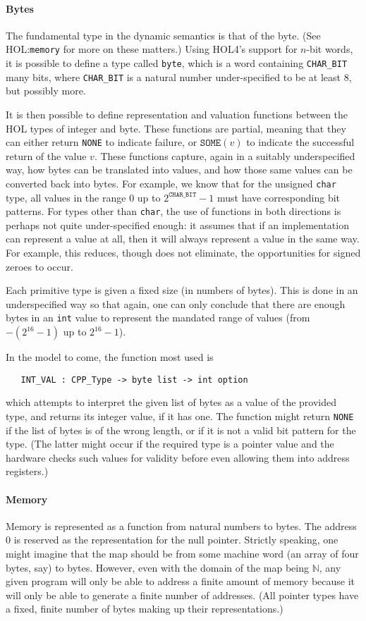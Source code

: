 \documentclass[11pt]{article}
\newcommand{\HOLfile}[1]{HOL:\texttt{#1}}
\begin{document}
\paragraph{Bytes} The fundamental type in the dynamic semantics is
that of the byte.  (See \HOLfile{memory} for more on these matters.)
Using HOL4's support for $n$-bit words, it is possible to define a
type called \texttt{byte}, which is a word containing
\texttt{CHAR_BIT} many bits, where \texttt{CHAR_BIT} is a natural
number under-specified to be at least 8, but possibly more.

It is then possible to define representation and valuation functions
between the HOL types of integer and byte.  These functions are
partial, meaning that they can either return \texttt{NONE} to indicate
failure, or $\texttt{SOME}(v)$ to indicate the successful return of
the value $v$.  These functions capture, again in a suitably
underspecified way, how bytes can be translated into values, and how
those same values can be converted back into bytes.  For example, we
know that for the unsigned \texttt{char} type, all values in the range
$0$ up to $2^{\texttt{CHAR_BIT}}-1$ must have corresponding bit
patterns.  For types other than \texttt{char}, the use of functions in
both directions is perhaps not quite under-specified enough: it
assumes that if an implementation can represent a value at all, then
it will always represent a value in the same way.  For example, this
reduces, though does not eliminate, the opportunities for signed
zeroes to occur.

Each primitive type is given a fixed size (in numbers of bytes).  This
is done in an underspecified way so that again, one can only conclude
that there are enough bytes in an \texttt{int} value to represent the
mandated range of values (from $-(2^{16} - 1)$ up to $2^{16} - 1$).

In the model to come, the function most used is
\begin{verbatim}
   INT_VAL : CPP_Type -> byte list -> int option
\end{verbatim}
which attempts to interpret the given list of bytes as a value of the
provided type, and returns its integer value, if it has one.  The
function might return \texttt{NONE} if the list of bytes is of the
wrong length, or if it is not a valid bit pattern for the type.  (The
latter might occur if the required type is a pointer value and the
hardware checks such values for validity before even allowing them
into address registers.)

\paragraph{Memory}
Memory is represented as a function from natural numbers to bytes.
The address 0 is reserved as the representation for the null pointer.
Strictly speaking, one might imagine that the map should be from some
machine word (an array of four bytes, say) to bytes.  However, even
with the domain of the map being $\mathbb{N}$, any given program will
only be able to address a finite amount of memory because it will only
be able to generate a finite number of addresses.  (All pointer types
have a fixed, finite number of bytes making up their representations.)
\end{document}

